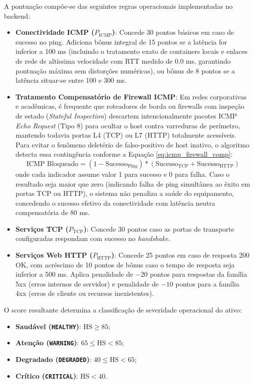 \documentclass[12pt,a4paper]{article}
\begin{document}
A pontuação compõe-se das seguintes regras operacionais implementadas no backend:
\begin{itemize}[leftmargin=1.25cm]
\item \textbf{Conectividade ICMP ($P_{\text{ICMP}}$)}: Concede 30 pontos básicos em caso de sucesso no ping. Adiciona bônus integral de 15 pontos se a latência for inferior a 100 ms (incluindo o tratamento exato de containers locais e enlaces de rede de altíssima velocidade com RTT medido de 0.0 ms, garantindo pontuação máxima sem distorções numéricas), ou bônus de 8 pontos se a latência situar-se entre 100 e 300 ms.
\item \textbf{Tratamento Compensatório de Firewall ICMP}: Em redes corporativas e acadêmicas, é frequente que roteadores de borda ou firewalls com inspeção de estado (\textit{Stateful Inspection}) descartem intencionalmente pacotes ICMP \textit{Echo Request} (Tipo 8) para ocultar o host contra varreduras de perímetro, mantendo todavia portas L4 (TCP) ou L7 (HTTP) totalmente acessíveis. Para evitar o fenômeno deletério de falso-positivo de host inativo, o algoritmo detecta essa contingência conforme a Equação \ref{eq:icmp_firewall_comp}:
\begin{equation}
\label{eq:icmp_firewall_comp}
\text{ICMP Bloqueado} = (1 - \text{Sucesso}_{\text{Ping}}) * (\text{Sucesso}_{\text{TCP}} + \text{Sucesso}_{\text{HTTP}})
\end{equation}
onde cada indicador assume valor 1 para sucesso e 0 para falha. Caso o resultado seja maior que zero (indicando falha de ping simultânea ao êxito em portas TCP ou HTTP), o sistema não penaliza a saúde do equipamento, concedendo o sucesso efetivo da conectividade com latência neutra compensatória de 80 ms.
\item \textbf{Serviços TCP ($P_{\text{TCP}}$)}: Concede 30 pontos caso as portas de transporte configuradas respondam com sucesso no \textit{handshake}.
\item \textbf{Serviços Web HTTP ($P_{\text{HTTP}}$)}: Concede 25 pontos em caso de resposta 200 OK, com acréscimo de 10 pontos de bônus caso o tempo de resposta seja inferior a 500 ms. Aplica penalidade de $-20$ pontos para respostas da família 5xx (erros internos de servidor) e penalidade de $-10$ pontos para a família 4xx (erros de cliente ou recursos inexistentes).
\end{itemize}

O score resultante determina a classificação de severidade operacional do ativo:
\begin{itemize}[leftmargin=1.25cm]
\item \textbf{Saudável (\texttt{HEALTHY})}: $\text{HS} \ge 85$;
\item \textbf{Atenção (\texttt{WARNING})}: $65 \le \text{HS} < 85$;
\item \textbf{Degradado (\texttt{DEGRADED})}: $40 \le \text{HS} < 65$;
\item \textbf{Crítico (\texttt{CRITICAL})}: $\text{HS} < 40$.
\end{itemize}
\end{document}
